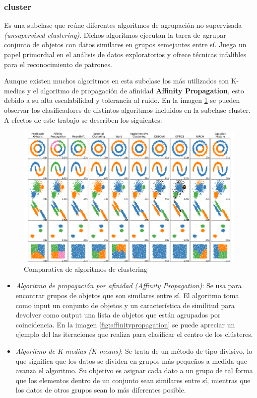 \documentclass[a4paper, 12pt]{book}
\begin{document}
\subsubsection{cluster}
\label{sec:sklearn_cluster}

Es una subclase que reúne diferentes algoritmos de agrupación no supervisada \textit{(unsupervised clustering)}. Dichos algoritmos ejecutan la tarea de agrupar conjunto de objetos con datos similares en grupos semejantes entre sí. Juega un papel primordial en el análisis de datos exploratorios y ofrece técnicas infalibles para el reconocimiento de patrones.

Aunque existen muchos algoritmos en esta subclase los más utilizados son K-medias y el algoritmo de propagación de afinidad \textbf{Affinity Propagation}, esto debido a su alta escalabilidad y tolerancia al ruido. En la imagen \ref{fig:comparativa_algoritmos} se pueden observar los clasificadores de distintos algoritmos incluidos en la subclase cluster. A efectos de este trabajo se describen los siguientes:

\begin{figure}[!htb]
    \centering
    \includegraphics[width=17cm, keepaspectratio]{img/algorithm_comparison.png}
    \caption{Comparativa de algoritmos de clustering}
    \label{fig:comparativa_algoritmos}
\end{figure}

\begin{itemize}
\item \textit{Algoritmo de propagación por afinidad (Affinity Propagation)}: Se usa para encontrar grupos de objetos que son similares entre sí. El algoritmo toma como input un conjunto de objetos y un característica de similitud para devolver como output una lista de objetos que están agrupados por coincidencia. En la imagen \ref{fig:affinitypropagation} se puede apreciar un ejemplo del las iteraciones que realiza para clasificar el centro de los clústeres.
\item \textit{Algoritmo de K-medias (K-means)}: Se trata de un método de tipo divisivo, lo que significa que los datos se dividen en grupos más pequeños a medida que avanza el algoritmo. Su objetivo es asignar cada dato a un grupo de tal forma que los elementos dentro de un conjunto sean similares entre sí,  mientras que los datos de otros grupos sean lo más diferentes posible.
\end{itemize}
\end{document}
